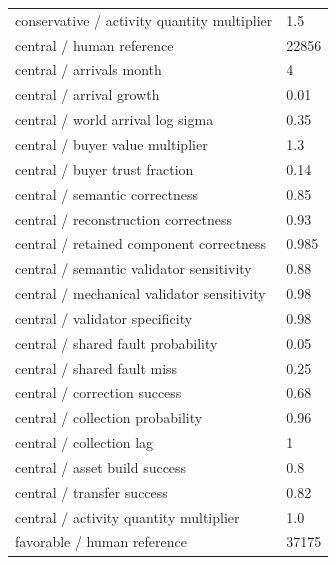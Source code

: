 \documentclass[10pt]{article}
\begin{document}
\begin{longtable}{p{.44\linewidth}p{.50\linewidth}}
conservative / activity quantity multiplier & 1.5\\

central / human reference & 22856\\

central / arrivals month & 4\\

central / arrival growth & 0.01\\

central / world arrival log sigma & 0.35\\

central / buyer value multiplier & 1.3\\

central / buyer trust fraction & 0.14\\

central / semantic correctness & 0.85\\

central / reconstruction correctness & 0.93\\

central / retained component correctness & 0.985\\

central / semantic validator sensitivity & 0.88\\

central / mechanical validator sensitivity & 0.98\\

central / validator specificity & 0.98\\

central / shared fault probability & 0.05\\

central / shared fault miss & 0.25\\

central / correction success & 0.68\\

central / collection probability & 0.96\\

central / collection lag & 1\\

central / asset build success & 0.8\\

central / transfer success & 0.82\\

central / activity quantity multiplier & 1.0\\

favorable / human reference & 37175\\


\end{longtable}
\end{document}
